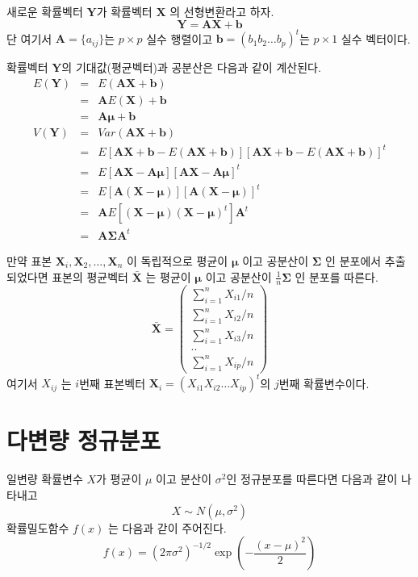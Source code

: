 \documentclass[
]{book}
\theoremstyle{definition}
\theoremstyle{definition}
\theoremstyle{definition}
\theoremstyle{definition}
\theoremstyle{remark}
\begin{document}
새로운 확률벡터 \(\bm Y\)가 확률벡터 \(\bm X\) 의 선형변환라고 하자.
\[ \bm Y = \bm A  \bm X + \bm b \]
단 여기서 \(\bm A = \{ a_{ij} \}\)는 \(p \times p\) 실수 행렬이고
\(\bm b =(b_1 b_2 \dots b_p)^t\)는 \(p \times 1\) 실수 벡터이다.

확률벡터 \(\bm Y\)의 기대값(평균벡터)과 공분산은 다음과 같이 계산된다.
\begin{eqnarray*}
E(\bm Y ) &=& E(\bm A \bm X+ \bm b) \\
&=& \bm A E(\bm X)+ \bm b \\
&=& \bm A \bm \mu+ \bm b \\
V(\bm Y) &=& Var(\bm A \bm X+ \bm b) \\
&=& E[\bm A \bm X+ \bm b -E(\bm A \bm X+ \bm b)] [\bm A \bm X+ \bm b -E(\bm A \bm X+ \bm b)]^t \\
&=& E[\bm A \bm X -  \bm A \bm \mu] [\bm A \bm X -  \bm A \bm \mu]^t \\
&=& E[\bm A (\bm X - \bm \mu)] [\bm A (\bm X - \bm \mu)]^t \\
&=& \bm A E [(\bm X - \bm \mu) (\bm X - \bm \mu)^t] \bm A^t \\
&=& \bm A \bm \Sigma \bm A^t
\end{eqnarray*}

만약 표본 \(\bm X_i, \bm X_2, \dots, \bm X_n\) 이 독립적으로 평균이 \(\bm \mu\) 이고 공분산이 \(\bm \Sigma\)
인 분포에서 추출되었다면 표본의 평균벡터 \(\bar {\bm X}\) 는 평균이 \(\bm \mu\) 이고 공분산이 \(\frac{1}{n}\bm \Sigma\)
인 분포를 따른다.
\begin{equation*}
\bar {\bm X} =
  \begin{pmatrix}
\sum_{i=1}^n X_{i1} / n  \\
\sum_{i=1}^n X_{i2} / n \\
\sum_{i=1}^n X_{i3} / n \\
..  \\
\sum_{i=1}^n X_{ip} / n 
\end{pmatrix}
\end{equation*}
여기서 \(X_{ij}\) 는 \(i\)번째 표본벡터 \(\bm X_i =(X_{i1} X_{i2} \dots X_{ip})^t\)의 \(j\)번째 확률변수이다.

\hypertarget{uxb2e4uxbcc0uxb7c9-uxc815uxaddcuxbd84uxd3ec}{%
\section{다변량 정규분포}\label{uxb2e4uxbcc0uxb7c9-uxc815uxaddcuxbd84uxd3ec}}

일변량 확률변수 \(X\)가 평균이 \(\mu\) 이고 분산이 \(\sigma^2\)인 정규분포를 따른다면 다음과 같이 나타내고 \[ X \sim N(\mu, \sigma^2 ) \]
확률밀도함수 \(f(x)\) 는 다음과 갇이 주어진다.
\[ f(x) = (2 \pi \sigma^2)^{-1/2} \exp \left ( - \frac{(x-\mu)^2}{2} \right ) \]
\end{document}
